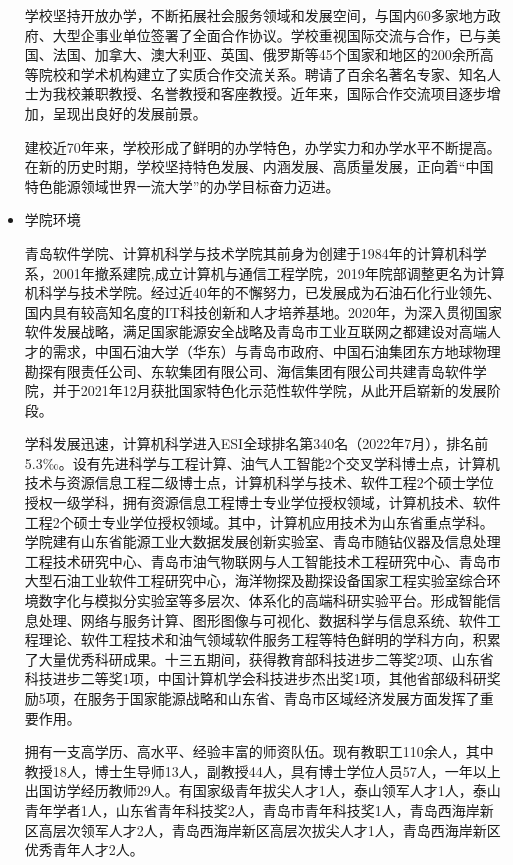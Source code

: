 \documentclass{article}
\begin{document}
\begin{itemize}
学校坚持开放办学，不断拓展社会服务领域和发展空间，与国内60多家地方政府、大型企事业单位签署了全面合作协议。学校重视国际交流与合作，已与美国、法国、加拿大、澳大利亚、英国、俄罗斯等45个国家和地区的200余所高等院校和学术机构建立了实质合作交流关系。聘请了百余名著名专家、知名人士为我校兼职教授、名誉教授和客座教授。近年来，国际合作交流项目逐步增加，呈现出良好的发展前景。

建校近70年来，学校形成了鲜明的办学特色，办学实力和办学水平不断提高。在新的历史时期，学校坚持特色发展、内涵发展、高质量发展，正向着“中国特色能源领域世界一流大学”的办学目标奋力迈进。
\item 学院环境\par
青岛软件学院、计算机科学与技术学院其前身为创建于1984年的计算机科学系，2001年撤系建院,成立计算机与通信工程学院，2019年院部调整更名为计算机科学与技术学院。经过近40年的不懈努力，已发展成为石油石化行业领先、国内具有较高知名度的IT科技创新和人才培养基地。2020年，为深入贯彻国家软件发展战略，满足国家能源安全战略及青岛市工业互联网之都建设对高端人才的需求，中国石油大学（华东）与青岛市政府、中国石油集团东方地球物理勘探有限责任公司、东软集团有限公司、海信集团有限公司共建青岛软件学院，并于2021年12月获批国家特色化示范性软件学院，从此开启崭新的发展阶段。

学科发展迅速，计算机科学进入ESI全球排名第340名（2022年7月），排名前5.3‰。设有先进科学与工程计算、油气人工智能2个交叉学科博士点，计算机技术与资源信息工程二级博士点，计算机科学与技术、软件工程2个硕士学位授权一级学科，拥有资源信息工程博士专业学位授权领域，计算机技术、软件工程2个硕士专业学位授权领域。其中，计算机应用技术为山东省重点学科。学院建有山东省能源工业大数据发展创新实验室、青岛市随钻仪器及信息处理工程技术研究中心、青岛市油气物联网与人工智能技术工程研究中心、青岛市大型石油工业软件工程研究中心，海洋物探及勘探设备国家工程实验室综合环境数字化与模拟分实验室等多层次、体系化的高端科研实验平台。形成智能信息处理、网络与服务计算、图形图像与可视化、数据科学与信息系统、软件工程理论、软件工程技术和油气领域软件服务工程等特色鲜明的学科方向，积累了大量优秀科研成果。十三五期间，获得教育部科技进步二等奖2项、山东省科技进步二等奖1项，中国计算机学会科技进步杰出奖1项，其他省部级科研奖励5项，在服务于国家能源战略和山东省、青岛市区域经济发展方面发挥了重要作用。

拥有一支高学历、高水平、经验丰富的师资队伍。现有教职工110余人，其中教授18人，博士生导师13人，副教授44人，具有博士学位人员57人，一年以上出国访学经历教师29人。有国家级青年拔尖人才1人，泰山领军人才1人，泰山青年学者1人，山东省青年科技奖2人，青岛市青年科技奖1人，青岛西海岸新区高层次领军人才2人，青岛西海岸新区高层次拔尖人才1人，青岛西海岸新区优秀青年人才2人。


\end{itemize}
\end{document}
